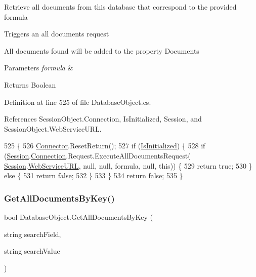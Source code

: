 Retrieve all documents from this database that correspond to the provided formula 

Triggers an all documents request

All documents found will be added to the property \textquotesingle{}Documents\textquotesingle{}


\begin{DoxyParams}{Parameters}
{\em formula} & \\
\hline
\end{DoxyParams}
\begin{DoxyReturn}{Returns}
Boolean
\end{DoxyReturn}


Definition at line 525 of file Database\+Object.\+cs.



References Session\+Object.\+Connection, Is\+Initialized, Session, and Session\+Object.\+Web\+Service\+U\+RL.


\begin{DoxyCode}
525                                                          \{
526         \mbox{\hyperlink{class_connector}{Connector}}.ResetReturn();
527         \textcolor{keywordflow}{if} (\mbox{\hyperlink{class_database_object_a5fe036d32a30eb10d1b3f6a30263f740}{IsInitialized}}) \{
528             \textcolor{keywordflow}{if} (\mbox{\hyperlink{class_database_object_aa8484162b7d2a7c4c9426bca13c64c07}{Session}}.\mbox{\hyperlink{class_session_object_a014bdbf705a753540e19bfb53030c55c}{Connection}}.Request.ExecuteAllDocumentsRequest(
      \mbox{\hyperlink{class_database_object_aa8484162b7d2a7c4c9426bca13c64c07}{Session}}.\mbox{\hyperlink{class_session_object_a697c071c812fbf7ad1166b896fb44c16}{WebServiceURL}}, null, null, formula, null, \textcolor{keyword}{this})) \{
529                 \textcolor{keywordflow}{return} \textcolor{keyword}{true};
530             \} \textcolor{keywordflow}{else} \{
531                 \textcolor{keywordflow}{return} \textcolor{keyword}{false};
532             \}
533         \}
534         \textcolor{keywordflow}{return} \textcolor{keyword}{false};
535     \}
\end{DoxyCode}
\mbox{\label{class_database_object_ad4834e7677cd0418969a657eed99653c}} 
\subsubsection{\texorpdfstring{Get\+All\+Documents\+By\+Key()}{GetAllDocumentsByKey()}}
{\footnotesize\ttfamily bool Database\+Object.\+Get\+All\+Documents\+By\+Key (\begin{DoxyParamCaption}\item[{string}]{search\+Field,  }\item[{string}]{search\+Value }\end{DoxyParamCaption})}



